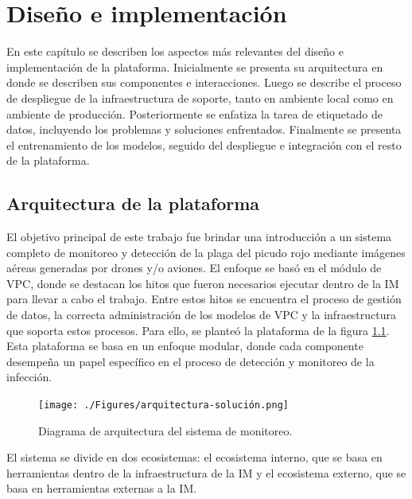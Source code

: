 \chapter{Diseño e implementación} %
\label{Chapter3} %

En este capítulo se describen los aspectos más relevantes del diseño e implementación de la plataforma. Inicialmente se presenta su arquitectura en donde se describen sus componentes e interacciones. Luego se describe el proceso de despliegue de la infraestructura de soporte, tanto en ambiente local como en ambiente de producción. Posteriormente se enfatiza la tarea de etiquetado de datos, incluyendo los problemas y soluciones enfrentados. Finalmente se presenta el entrenamiento de los modelos, seguido del despliegue e integración con el resto de la plataforma.

\section{Arquitectura de la plataforma}
\label{sec:arquitectura}

El objetivo principal de este trabajo fue brindar una introducción a un sistema completo de monitoreo y detección de la plaga del picudo rojo mediante imágenes aéreas generadas por drones y/o aviones. El enfoque se basó en el módulo de VPC, donde se destacan los hitos que fueron necesarios ejecutar dentro de la IM para llevar a cabo el trabajo. Entre estos hitos se encuentra el proceso de gestión de datos, la correcta administración de los modelos de VPC y la infraestructura que soporta estos procesos. Para ello, se planteó la plataforma de la figura \ref{fig:plataforma}. Esta plataforma se basa en un enfoque modular, donde cada componente desempeña un papel específico en el proceso de detección y monitoreo de la infección.

\begin{figure}[H]
  \centering
  \texttt{[image: ./Figures/arquitectura-solución.png]}
  \caption{Diagrama de arquitectura del sistema de monitoreo.}
  \label{fig:plataforma}
\end{figure}

El sistema se divide en dos ecosistemas: el ecosistema interno, que se basa en herramientas dentro de la infraestructura de la IM y el ecosistema externo, que se basa en herramientas externas a la IM.

